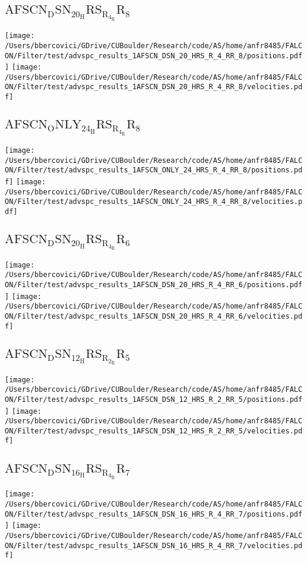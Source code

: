 \subsection{$\mathrm{AFSCN_DSN_20_HRS_R_4_RR_8}$}
\texttt{[image: /Users/bbercovici/GDrive/CUBoulder/Research/code/AS/home/anfr8485/FALCON/Filter/test/advspc\_results\_1AFSCN\_DSN\_20\_HRS\_R\_4\_RR\_8/positions.pdf]}
\texttt{[image: /Users/bbercovici/GDrive/CUBoulder/Research/code/AS/home/anfr8485/FALCON/Filter/test/advspc\_results\_1AFSCN\_DSN\_20\_HRS\_R\_4\_RR\_8/velocities.pdf]}
\subsection{$\mathrm{AFSCN_ONLY_24_HRS_R_4_RR_8}$}
\texttt{[image: /Users/bbercovici/GDrive/CUBoulder/Research/code/AS/home/anfr8485/FALCON/Filter/test/advspc\_results\_1AFSCN\_ONLY\_24\_HRS\_R\_4\_RR\_8/positions.pdf]}
\texttt{[image: /Users/bbercovici/GDrive/CUBoulder/Research/code/AS/home/anfr8485/FALCON/Filter/test/advspc\_results\_1AFSCN\_ONLY\_24\_HRS\_R\_4\_RR\_8/velocities.pdf]}
\subsection{$\mathrm{AFSCN_DSN_20_HRS_R_4_RR_6}$}
\texttt{[image: /Users/bbercovici/GDrive/CUBoulder/Research/code/AS/home/anfr8485/FALCON/Filter/test/advspc\_results\_1AFSCN\_DSN\_20\_HRS\_R\_4\_RR\_6/positions.pdf]}
\texttt{[image: /Users/bbercovici/GDrive/CUBoulder/Research/code/AS/home/anfr8485/FALCON/Filter/test/advspc\_results\_1AFSCN\_DSN\_20\_HRS\_R\_4\_RR\_6/velocities.pdf]}
\subsection{$\mathrm{AFSCN_DSN_12_HRS_R_2_RR_5}$}
\texttt{[image: /Users/bbercovici/GDrive/CUBoulder/Research/code/AS/home/anfr8485/FALCON/Filter/test/advspc\_results\_1AFSCN\_DSN\_12\_HRS\_R\_2\_RR\_5/positions.pdf]}
\texttt{[image: /Users/bbercovici/GDrive/CUBoulder/Research/code/AS/home/anfr8485/FALCON/Filter/test/advspc\_results\_1AFSCN\_DSN\_12\_HRS\_R\_2\_RR\_5/velocities.pdf]}
\subsection{$\mathrm{AFSCN_DSN_16_HRS_R_4_RR_7}$}
\texttt{[image: /Users/bbercovici/GDrive/CUBoulder/Research/code/AS/home/anfr8485/FALCON/Filter/test/advspc\_results\_1AFSCN\_DSN\_16\_HRS\_R\_4\_RR\_7/positions.pdf]}
\texttt{[image: /Users/bbercovici/GDrive/CUBoulder/Research/code/AS/home/anfr8485/FALCON/Filter/test/advspc\_results\_1AFSCN\_DSN\_16\_HRS\_R\_4\_RR\_7/velocities.pdf]}
